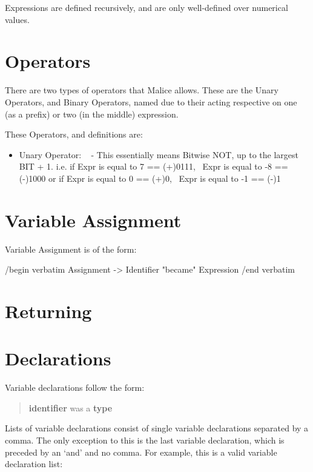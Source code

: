 \documentclass[a4wide, 11pt]{article}
\begin{document}
Expressions are defined recursively, and are only well-defined over numerical values.

\section{Operators}

There are two types of operators that Malice allows. These are the Unary Operators, and Binary Operators, named due to their acting respective on one (as a prefix) or two (in the middle) expression.

These Operators, and definitions are:

\begin{itemize}

\item
Unary Operator: ~ - This essentially means Bitwise NOT, up to the largest BIT + 1.
i.e. if Expr is equal to 7 == (+)0111, ~Expr is equal to -8 == (-)1000
or  if Expr is equal to  0 == (+)0, ~Expr is equal to -1 == (-)1
    
\end{itemize}


\section{Variable Assignment}

Variable Assignment is of the form:

/begin {verbatim}
Assignment      -> Identifier "became" Expression
/end {verbatim}

\section {Returning}

\section{Declarations}

Variable declarations follow the form:

\begin{quote}
\textbf{identifier} was a \textbf{type}
\end{quote}

Lists of variable declarations consist of single variable declarations separated by a comma. The only exception to this is the last variable declaration, which is preceded by an `and' and no comma. For example, this is a valid variable declaration list:
\end{document}
